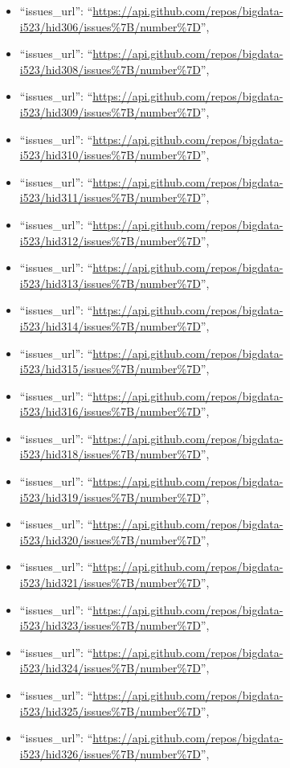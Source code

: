 \begin{itemize}
\item
  ``issues\_url'':
  ``\url{https://api.github.com/repos/bigdata-i523/hid306/issues\%7B/number\%7D}'',
\item
  ``issues\_url'':
  ``\url{https://api.github.com/repos/bigdata-i523/hid308/issues\%7B/number\%7D}'',
\item
  ``issues\_url'':
  ``\url{https://api.github.com/repos/bigdata-i523/hid309/issues\%7B/number\%7D}'',
\item
  ``issues\_url'':
  ``\url{https://api.github.com/repos/bigdata-i523/hid310/issues\%7B/number\%7D}'',
\item
  ``issues\_url'':
  ``\url{https://api.github.com/repos/bigdata-i523/hid311/issues\%7B/number\%7D}'',
\item
  ``issues\_url'':
  ``\url{https://api.github.com/repos/bigdata-i523/hid312/issues\%7B/number\%7D}'',
\item
  ``issues\_url'':
  ``\url{https://api.github.com/repos/bigdata-i523/hid313/issues\%7B/number\%7D}'',
\item
  ``issues\_url'':
  ``\url{https://api.github.com/repos/bigdata-i523/hid314/issues\%7B/number\%7D}'',
\item
  ``issues\_url'':
  ``\url{https://api.github.com/repos/bigdata-i523/hid315/issues\%7B/number\%7D}'',
\item
  ``issues\_url'':
  ``\url{https://api.github.com/repos/bigdata-i523/hid316/issues\%7B/number\%7D}'',
\item
  ``issues\_url'':
  ``\url{https://api.github.com/repos/bigdata-i523/hid318/issues\%7B/number\%7D}'',
\item
  ``issues\_url'':
  ``\url{https://api.github.com/repos/bigdata-i523/hid319/issues\%7B/number\%7D}'',
\item
  ``issues\_url'':
  ``\url{https://api.github.com/repos/bigdata-i523/hid320/issues\%7B/number\%7D}'',
\item
  ``issues\_url'':
  ``\url{https://api.github.com/repos/bigdata-i523/hid321/issues\%7B/number\%7D}'',
\item
  ``issues\_url'':
  ``\url{https://api.github.com/repos/bigdata-i523/hid323/issues\%7B/number\%7D}'',
\item
  ``issues\_url'':
  ``\url{https://api.github.com/repos/bigdata-i523/hid324/issues\%7B/number\%7D}'',
\item
  ``issues\_url'':
  ``\url{https://api.github.com/repos/bigdata-i523/hid325/issues\%7B/number\%7D}'',
\item
  ``issues\_url'':
  ``\url{https://api.github.com/repos/bigdata-i523/hid326/issues\%7B/number\%7D}'',

\end{itemize}
